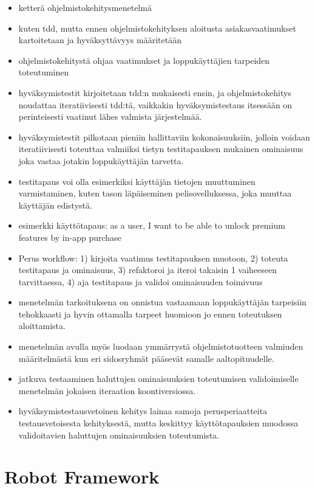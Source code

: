   \begin{itemize}
    \item ketterä ohjelmistokehitysmenetelmä
    \item kuten tdd, mutta ennen ohjelmistokehityksen aloitusta asiakasvaatimukset kartoitetaan ja hyväksyttävyys määritetään
    \item ohjelmistokehitystä ohjaa vaatimukset ja loppukäyttäjien tarpeiden toteutuminen
    \item hyväksymistestit kirjoitetaan tdd:n mukaisesti ensin, ja ohjelmistokehitys noudattaa iteratiivisesti tdd:tä, vaikkakin hyväksymistestaus itsessään on perinteisesti vaatinut lähes valmista järjestelmää.
    \item hyväksymistestit pilkotaan pieniin hallittaviin kokonaisuuksiin, jolloin voidaan iteratiivisesti toteuttaa valmiiksi tietyn testitapauksen mukainen ominaisuus joka vastaa jotakin loppukäyttäjän tarvetta.
    \item testitapaus voi olla esimerkiksi käyttäjän tietojen muuttuminen varmistaminen, kuten tason läpäiseminen pelisovelluksessa, joka muuttaa käyttäjän edistystä.
    \item esimerkki käyttötapaus: as a user, I want to be able to unlock premium features by in-app purchase
    \item Perus workflow: 1) kirjoita vaatimus testitapauksen muotoon, 2) toteuta testitapaus ja ominaisuus, 3) refaktoroi ja iteroi takaisin 1 vaiheeseen tarvittaessa, 4) aja testitapaus ja validoi ominaisuuden toimivuus
    \item menetelmän tarkoituksena on onnistua vastaamaan loppukäyttäjän tarpeisiin tehokkaasti ja hyvin ottamalla tarpeet huomioon jo ennen toteutuksen aloittamista.
    \item menetelmän avulla myös luodaan ymmärrystä ohjelmistotuotteen valmiuden määritelmästä kun eri sidosryhmät pääsevät samalle aaltopituudelle.
    \item jatkuva testaaminen haluttujen ominaisuuksien toteutumisen validoimiselle menetelmän jokaisen iteraation koontiversiossa.
    \item hyväksymistestausvetoinen kehitys lainaa samoja perusperiaatteita testausvetoisesta kehityksestä, mutta keskittyy käyttötapauksien muodossa validoitavien haluttujen ominaisuuksien toteutumista.
  \end{itemize}

\section{Robot Framework} \label{ch:08_robot_framework}

